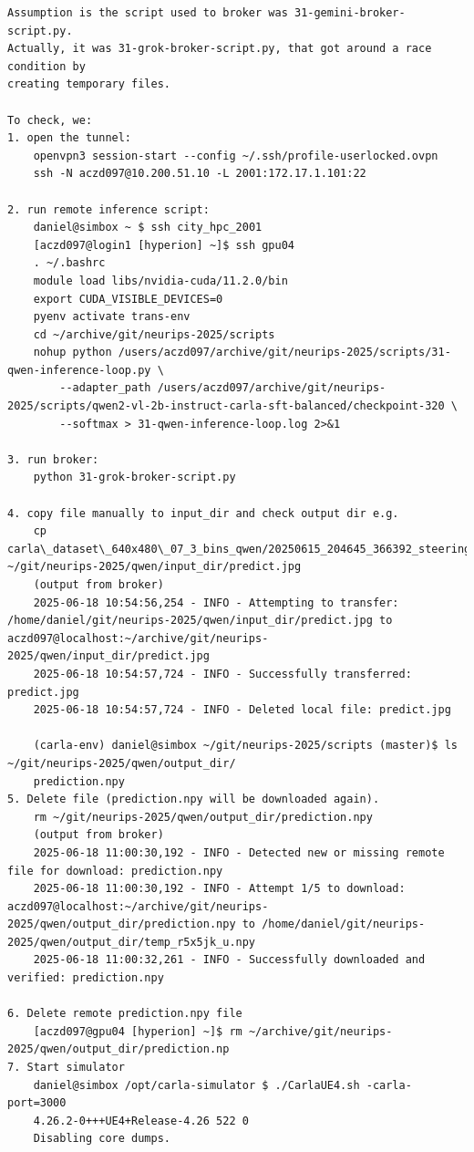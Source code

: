 \begin{verbatim}
Assumption is the script used to broker was 31-gemini-broker-script.py.
Actually, it was 31-grok-broker-script.py, that got around a race condition by 
creating temporary files.

To check, we:
1. open the tunnel:
    openvpn3 session-start --config ~/.ssh/profile-userlocked.ovpn
    ssh -N aczd097@10.200.51.10 -L 2001:172.17.1.101:22
    
2. run remote inference script:
    daniel@simbox ~ $ ssh city_hpc_2001
    [aczd097@login1 [hyperion] ~]$ ssh gpu04
    . ~/.bashrc
    module load libs/nvidia-cuda/11.2.0/bin
    export CUDA_VISIBLE_DEVICES=0
    pyenv activate trans-env
    cd ~/archive/git/neurips-2025/scripts
    nohup python /users/aczd097/archive/git/neurips-2025/scripts/31-qwen-inference-loop.py \
        --adapter_path /users/aczd097/archive/git/neurips-2025/scripts/qwen2-vl-2b-instruct-carla-sft-balanced/checkpoint-320 \
        --softmax > 31-qwen-inference-loop.log 2>&1
        
3. run broker:
    python 31-grok-broker-script.py 
    
4. copy file manually to input_dir and check output dir e.g.
    cp carla\_dataset\_640x480\_07_3_bins_qwen/20250615_204645_366392_steering_0.0000.jpg ~/git/neurips-2025/qwen/input_dir/predict.jpg
    (output from broker)
    2025-06-18 10:54:56,254 - INFO - Attempting to transfer: /home/daniel/git/neurips-2025/qwen/input_dir/predict.jpg to aczd097@localhost:~/archive/git/neurips-2025/qwen/input_dir/predict.jpg
    2025-06-18 10:54:57,724 - INFO - Successfully transferred: predict.jpg
    2025-06-18 10:54:57,724 - INFO - Deleted local file: predict.jpg
    
    (carla-env) daniel@simbox ~/git/neurips-2025/scripts (master)$ ls ~/git/neurips-2025/qwen/output_dir/
    prediction.npy
5. Delete file (prediction.npy will be downloaded again).
    rm ~/git/neurips-2025/qwen/output_dir/prediction.npy
    (output from broker)
    2025-06-18 11:00:30,192 - INFO - Detected new or missing remote file for download: prediction.npy
    2025-06-18 11:00:30,192 - INFO - Attempt 1/5 to download: aczd097@localhost:~/archive/git/neurips-2025/qwen/output_dir/prediction.npy to /home/daniel/git/neurips-2025/qwen/output_dir/temp_r5x5jk_u.npy
    2025-06-18 11:00:32,261 - INFO - Successfully downloaded and verified: prediction.npy

6. Delete remote prediction.npy file
    [aczd097@gpu04 [hyperion] ~]$ rm ~/archive/git/neurips-2025/qwen/output_dir/prediction.np
7. Start simulator
    daniel@simbox /opt/carla-simulator $ ./CarlaUE4.sh -carla-port=3000
    4.26.2-0+++UE4+Release-4.26 522 0
    Disabling core dumps.


\end{verbatim}
